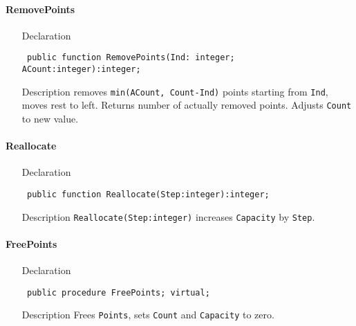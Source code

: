 \documentclass[12pt,a4paper,oneside]{report}
\newcommand{\declarationitem}[1]{{\addfontfeatures{FakeBold=1.3} #1}}
\newcommand{\descriptiontitle}[1]{{\addfontfeatures{FakeSlant}#1}}
\newcommand{\code}[1]{\texttt{#1}}
\begin{document}
\paragraph{RemovePoints}\hspace*{\fill}

\label{lmPointsVec.TPoints-RemovePoints}
\begin{itemize}\item[\declarationitem{Declaration}\hfill]
	\begin{flushleft}
		\code{
			public function RemovePoints(Ind: integer; ACount:integer):integer;}
		
	\end{flushleft}
	
	\par
	\item[\descriptiontitle{Description}]
	removes \code{min(ACount, Count{-}Ind)} points starting from \code{Ind}, moves rest to left. Returns number of actually removed points. Adjusts \code{Count} to new value.
	
\end{itemize}
\paragraph{Reallocate}\hspace*{\fill}

\label{lmPointsVec.TPoints-Reallocate}
\begin{itemize}\item[\declarationitem{Declaration}\hfill]
	\begin{flushleft}
		\code{
			public function Reallocate(Step:integer):integer;}
		
	\end{flushleft}
	
	\par
	\item[\descriptiontitle{Description}]
	\code{Reallocate(Step:integer)} increases \code{Capacity} by \code{Step}.
	
\end{itemize}
\paragraph{FreePoints}\hspace*{\fill}

\label{lmPointsVec.TPoints-FreePoints}
\begin{itemize}\item[\declarationitem{Declaration}\hfill]
	\begin{flushleft}
		\code{
			public procedure FreePoints; virtual;}
	\end{flushleft}
\item[\descriptiontitle{Description}]
Frees \code{Points}, sets \code{Count} and \code{Capacity} to zero.	
\end{itemize}
\end{document}
